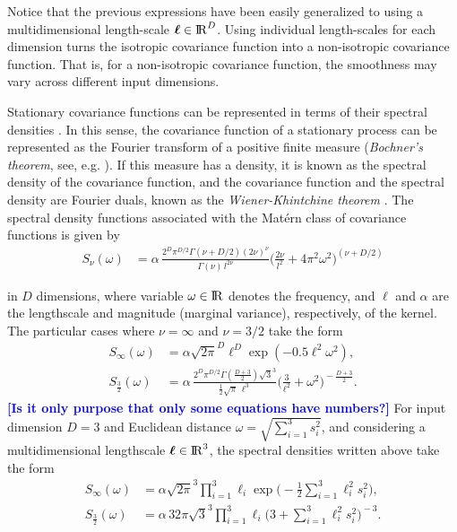 \documentclass[onecolumn,a4paper,11pt]{article}
\newcommand{\todo}[1]{\textcolor{blue}{\textbf{[#1]}}}
\begin{document}
\noindent Notice that the previous expressions have been easily generalized to using a multidimensional length-scale $\bm{\ell}\in {\rm I\!R}^D$. Using individual length-scales for each dimension turns the isotropic covariance function into a non-isotropic covariance function. That is, for a non-isotropic covariance function, the smoothness may vary across different input dimensions. 

Stationary covariance functions can be represented in terms of their spectral densities \citep{rasmussen2006gaussian}. In this sense, the covariance function of a stationary process can be represented as the Fourier transform of a positive finite measure (\textit{Bochner's theorem}, see, e.g. \cite{akhiezer1993theory}). If this measure has a density, it is known as the spectral density of the covariance function, and the covariance function and the spectral density are Fourier duals, known as the \textit{Wiener-Khintchine theorem} \citep{rasmussen2006gaussian}. The spectral density functions associated with the Mat\'ern class of covariance functions is given by
%
\begin{align*}
S_{\nu}(\omega)&= \alpha \, \frac{2^D\pi^{D/2}\Gamma(\nu+D/2)(2\nu)^{\nu}}{\Gamma(\nu)\, l^{2\nu}}\Big(\frac{2\nu}{l^2}+4\pi^2\omega^2 \Big)^{\!(\nu+D/2)}
\end{align*}

\noindent in $D$ dimensions, where variable $\omega\in {\rm I\!R}$ denotes the frequency, and $\ell$ and $\alpha$ are the lengthscale and magnitude (marginal variance), respectively, of the kernel. The particular cases where $\nu=\infty$ and $\nu=3/2$ take the form
%
\begin{align}
S_{\infty}(\omega)&= \alpha \sqrt{2\pi}^D  \ell^D \exp(-0.5 \ell^2 \omega^2), \label{eq_specdens_inf}  \\
S_{\frac{3}{2}}(\omega)&= \alpha \, \frac{2^D\pi^{D/2}\Gamma(\frac{D+3}{2})\sqrt{3}^3}{\frac{1}{2}\sqrt{\pi}\,\ell^3}\Big(\frac{3}{\ell^2}+\omega^2 \Big)^{\!-\frac{D+3}{2}}. \label{eq_specdens_32} 
\end{align}
\todo{Is it only purpose that only some equations have numbers?}
\noindent For input dimension $D=3$ and Euclidean distance $\omega=\sqrt{\sum_{i=1}^{3}s_i^2}$, and considering a multidimensional lengthscale $\bm{\ell} \in {\rm I\!R}^{3}$, the spectral densities written above take the form
%
\begin{align*}
S_{\infty}(\omega)&= \alpha \sqrt{2\pi}^{3}  \prod_{i=1}^{3} \ell_i  \exp\!\!\big(\!-\frac{1}{2} \sum_{i=1}^{3} \ell_i^2 s_i^2 \big),   \\
S_{\frac{3}{2}}(\omega)&= \alpha \, 32\pi\sqrt{3}^3\prod_{i=1}^{3}\ell_i\big(3+\sum_{i=1}^{3}\ell_i^2 s_i^2 \big)^{\!-3}.
\end{align*}
\end{document}
